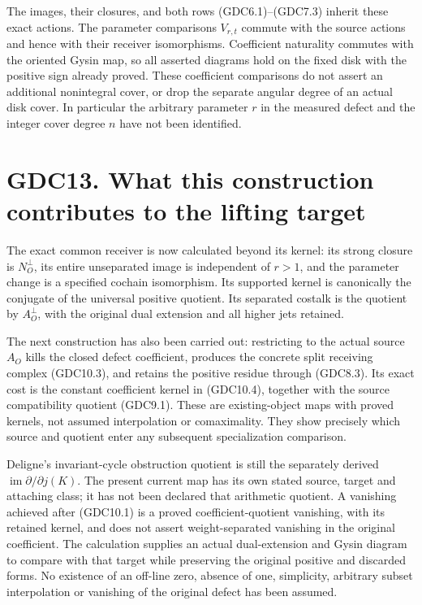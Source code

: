 The images, their closures, and both rows (GDC6.1)--(GDC7.3) inherit
these exact actions. The parameter comparisons \(V_{r,t}\) commute with
the source actions and hence with their receiver isomorphisms.
Coefficient naturality commutes with the oriented Gysin map, so all
asserted diagrams hold on the fixed disk with the positive sign already
proved. These coefficient comparisons do not assert an additional
nonintegral cover, or drop the separate angular degree of an actual disk
cover. In particular the arbitrary parameter \(r\) in the measured
defect and the integer cover degree \(n\) have not been identified.

\section{GDC13. What this construction contributes to the lifting
target}\label{gdc13.-what-this-construction-contributes-to-the-lifting-target}

The exact common receiver is now calculated beyond its kernel: its
strong closure is \(N_O^\perp\), its entire unseparated image is
independent of \(r>1\), and the parameter change is a specified cochain
isomorphism. Its supported kernel is canonically the conjugate of the
universal positive quotient. Its separated costalk is the quotient by
\(A_O^\perp\), with the original dual extension and all higher jets
retained.

The next construction has also been carried out: restricting to the
actual source \(A_O\) kills the closed defect coefficient, produces the
concrete split receiving complex (GDC10.3), and retains the positive
residue through (GDC8.3). Its exact cost is the constant coefficient
kernel in (GDC10.4), together with the source compatibility quotient
(GDC9.1). These are existing-object maps with proved kernels, not
assumed interpolation or comaximality. They show precisely which source
and quotient enter any subsequent specialization comparison.

Deligne's invariant-cycle obstruction quotient is still the separately
derived \(\operatorname{im}\partial/\partial j(K)\). The present current
map has its own stated source, target and attaching class; it has not
been declared that arithmetic quotient. A vanishing achieved after
(GDC10.1) is a proved coefficient-quotient vanishing, with its retained
kernel, and does not assert weight-separated vanishing in the original
coefficient. The calculation supplies an actual dual-extension and Gysin
diagram to compare with that target while preserving the original
positive and discarded forms. No existence of an off-line zero, absence
of one, simplicity, arbitrary subset interpolation or vanishing of the
original defect has been assumed.

